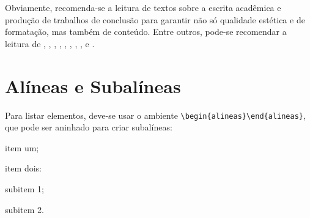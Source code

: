 Obviamente, recomenda-se a leitura de textos sobre a escrita acadêmica e produção de trabalhos de conclusão para garantir não só qualidade estética e de formatação, mas também de conteúdo. Entre outros, pode-se recomendar a leitura de \cite{Silva2005}, \cite{Martins2000}, \cite{Gil2002}, \cite{Franca2001}, \cite{Eco1996}, \cite{Moura1998}, \cite{Booth2000}, \cite{Hexsel2004}, \cite{Porto2002} e \cite{Henz2003}. 


\section{Alíneas e Subalíneas}
Para listar elementos, deve-se usar o ambiente \verb|\begin{alineas}\end{alineas}|, que pode ser aninhado para criar subalíneas:
\begin{alineas}
		\item item um;
		\item item dois:
		\begin{alineas}
			\item subitem 1;
			\item subitem 2.
		\end{alineas}
\end{alineas}

